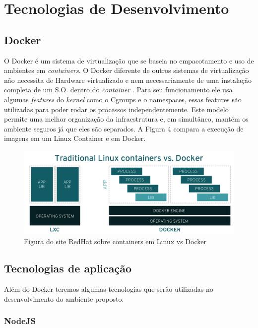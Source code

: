 \chapter{Tecnologias de Desenvolvimento}

\section{Docker}

O Docker é um sistema de virtualização que se baseia no empacotamento e uso de ambientes em \textit{containers}. O Docker diferente de outros sistemas de virtualização não necessita de Hardware virtualizado e nem necessariamente de uma instalação completa de um S.O. dentro do \textit{container} \cite{7742298}. Para seu funcionamento ele usa algumas \textit{features} do \textit{kernel} como o Cgroups e o namespaces, essas features são utilizadas para poder rodar os processos independentemente. Este modelo permite uma melhor organização da infraestrutura e, em simultâneo, mantém os ambiente seguros já que eles são separados. A Figura 4 compara a execução de imagens em um Linux Container e em Docker.

\begin{figure}[!htb]
     \centering
     \includegraphics[width=15cm]{traditional-linux-containers-vs-docker_0.png}
     \caption{Figura do site RedHat sobre containers em Linux vs Docker~\cite{docker}}
     \label{Label de referência para a imagem}
\end{figure}

\section{Tecnologias de aplicação}

Além do Docker teremos algumas tecnologias que serão utilizadas no desenvolvimento do ambiente proposto.

\subsection{NodeJS}

